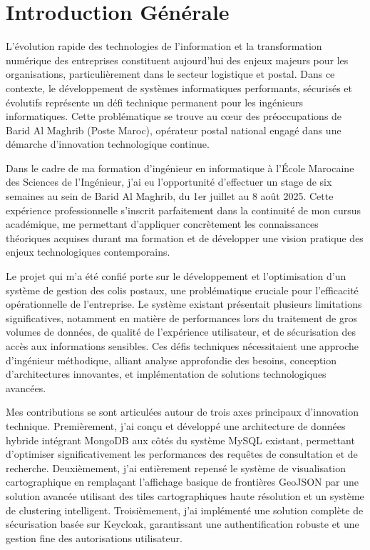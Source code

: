 \chapter*{Introduction Générale}

L'évolution rapide des technologies de l'information et la transformation numérique des entreprises constituent aujourd'hui des enjeux majeurs pour les organisations, particulièrement dans le secteur logistique et postal. Dans ce contexte, le développement de systèmes informatiques performants, sécurisés et évolutifs représente un défi technique permanent pour les ingénieurs informatiques. Cette problématique se trouve au cœur des préoccupations de Barid Al Maghrib (Poste Maroc), opérateur postal national engagé dans une démarche d'innovation technologique continue.

Dans le cadre de ma formation d'ingénieur en informatique à l'École Marocaine des Sciences de l'Ingénieur, j'ai eu l'opportunité d'effectuer un stage de six semaines au sein de Barid Al Maghrib, du 1er juillet au 8 août 2025. Cette expérience professionnelle s'inscrit parfaitement dans la continuité de mon cursus académique, me permettant d'appliquer concrètement les connaissances théoriques acquises durant ma formation et de développer une vision pratique des enjeux technologiques contemporains.

Le projet qui m'a été confié porte sur le développement et l'optimisation d'un système de gestion des colis postaux, une problématique cruciale pour l'efficacité opérationnelle de l'entreprise. Le système existant présentait plusieurs limitations significatives, notamment en matière de performances lors du traitement de gros volumes de données, de qualité de l'expérience utilisateur, et de sécurisation des accès aux informations sensibles. Ces défis techniques nécessitaient une approche d'ingénieur méthodique, alliant analyse approfondie des besoins, conception d'architectures innovantes, et implémentation de solutions technologiques avancées.

Mes contributions se sont articulées autour de trois axes principaux d'innovation technique. Premièrement, j'ai conçu et développé une architecture de données hybride intégrant MongoDB aux côtés du système MySQL existant, permettant d'optimiser significativement les performances des requêtes de consultation et de recherche. Deuxièmement, j'ai entièrement repensé le système de visualisation cartographique en remplaçant l'affichage basique de frontières GeoJSON par une solution avancée utilisant des tiles cartographiques haute résolution et un système de clustering intelligent. Troisièmement, j'ai implémenté une solution complète de sécurisation basée sur Keycloak, garantissant une authentification robuste et une gestion fine des autorisations utilisateur.

